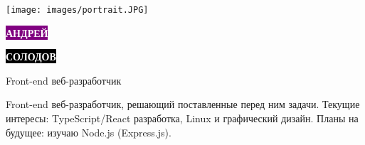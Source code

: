 \documentclass[9pt]{developercv} %
\begin{document}
\begin{minipage}{3.5cm}
    \texttt{[image: images/portrait.JPG]}
\end{minipage}
\begin{minipage}[t]{0.5\textwidth} %
	\colorbox{purple}{{\HUGE\textcolor{white}{\textbf{\MakeUppercase{Андрей}}}}} %
	
	\colorbox{black}{{\HUGE\textcolor{white}{\textbf{\MakeUppercase{Солодов}}}}} %
	
	\vspace{6pt}
	{\huge Front-end веб-разработчик} %
\end{minipage}




\begin{minipage}[t]{0.4\textwidth} %
	\vspace{-\baselineskip} %
Front-end веб-разработчик, решающий поставленные перед ним задачи. Текущие интересы: TypeScript/React разработка, Linux и графический дизайн. Планы на будущее: изучаю Node.js (Express.js).	
\end{minipage}
\hfill %
\begin{minipage}[t]{0.5\textwidth} %
	\vspace{-\baselineskip} %
	\begin{barchart}{5.5}
	\end{barchart}
\end{minipage}


\end{document}
